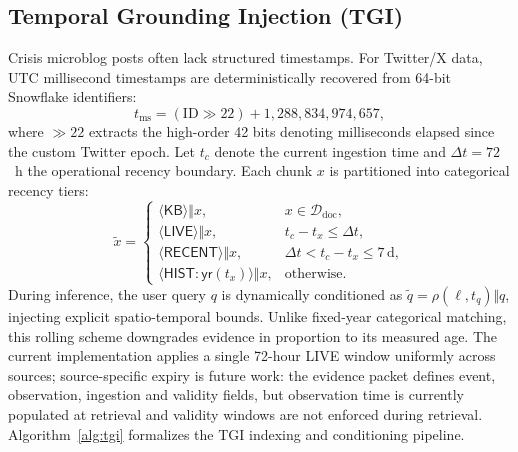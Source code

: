 \documentclass[conference]{IEEEtran}
\begin{document}
\subsection{Temporal Grounding Injection (TGI)}
Crisis microblog posts often lack structured timestamps. For Twitter/X data, UTC millisecond timestamps are deterministically recovered from 64-bit Snowflake identifiers:
\begin{equation}
t_{\mathrm{ms}} = (\mathrm{ID} \gg 22) + 1{,}288{,}834{,}974{,}657,
\label{eq:snow}
\end{equation}
where $\gg 22$ extracts the high-order 42 bits denoting milliseconds elapsed since the custom Twitter epoch. Let $t_c$ denote the current ingestion time and $\Delta t = 72$~h the operational recency boundary. Each chunk $x$ is partitioned into categorical recency tiers:
\begin{equation}
\tilde{x} =
\begin{cases}
\langle\mathsf{KB}\rangle \Vert x, & x \in \mathcal{D}_{\mathrm{doc}},\\[2pt]
\langle\mathsf{LIVE}\rangle \Vert x, & t_c - t_x \le \Delta t,\\[2pt]
\langle\mathsf{RECENT}\rangle \Vert x, & \Delta t < t_c - t_x \le 7\,\text{d},\\[2pt]
\langle\mathsf{HIST:yr}(t_x)\rangle \Vert x, & \text{otherwise.}
\end{cases}
\label{eq:tgi}
\end{equation}
During inference, the user query $q$ is dynamically conditioned as $\tilde{q} = \rho(\ell, t_q) \Vert q$, injecting explicit spatio-temporal bounds. Unlike fixed-year categorical matching, this rolling scheme downgrades evidence in proportion to its measured age. The current implementation applies a single 72-hour LIVE window uniformly across sources; source-specific expiry is future work: the evidence packet defines event, observation, ingestion and validity fields, but observation time is currently populated at retrieval and validity windows are not enforced during retrieval. Algorithm~\ref{alg:tgi} formalizes the TGI indexing and conditioning pipeline.
\end{document}
